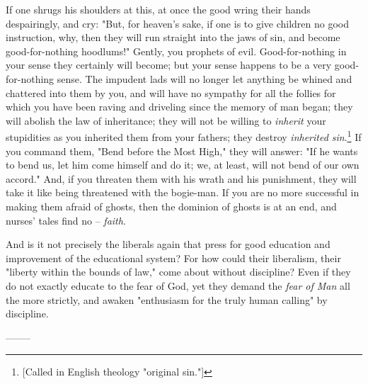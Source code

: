 If one shrugs his shoulders at this, at once the good wring their hands 
despairingly, and cry: "{}But, for heaven's sake, if one is to give children 
no good instruction, why, then they will run straight into the jaws of sin, 
and become good-for-nothing hoodlums!"{} Gently, you prophets of evil. 
Good-for-nothing in your sense they certainly will become; but your sense 
happens to be a very good-for-nothing sense. The impudent lads will no longer 
let anything be whined and chattered into them by you, and will have no 
sympathy for all the follies for which you have been raving and driveling 
since the memory of man began; they will abolish the law of inheritance; they 
will not be willing to \textit{inherit} your stupidities as you inherited them 
from your fathers; they destroy \textit{inherited sin}.\footnote{[Called in 
English theology "{}original sin."{}]} If you command them, "{}Bend before the 
Most High,"{} they will answer: "{}If he wants to bend us, let him come 
himself and do it; we, at least, will not bend of our own accord."{} And, if 
you threaten them with his wrath and his punishment, they will take it like 
being threatened with the bogie-man. If you are no more successful in making 
them afraid of ghosts, then the dominion of ghosts is at an end, and nurses' 
tales find no -- \textit{faith}.

And is it not precisely the liberals again that press for good education and 
improvement of the educational system? For how could their liberalism, their 
"{}liberty within the bounds of law,"{} come about without discipline? Even if 
they do not exactly educate to the fear of God, yet they demand the 
\textit{fear of Man} all the more strictly, and awaken "{}enthusiasm for the 
truly human calling"{} by discipline.

\begin{center}
--------\end{center}


